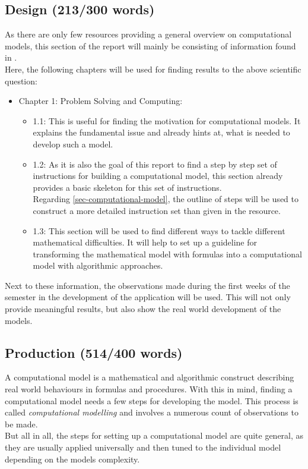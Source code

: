 \documentclass[conference,compsoc]{IEEEtran}
\begin{document}
\subsection{Design (213/300 words)}
As there are only few resources providing a general overview on computational models, this section of the report will mainly be consisting of information found in \cite{ComputationalModelsIntroduction}.\\
Here, the following chapters will be used for finding results to the above scientific question:
\begin{itemize}
	\item Chapter 1: Problem Solving and Computing:
	\begin{itemize}
		\item 1.1: This is useful for finding the motivation for computational models. It explains the fundamental issue and already hints at, what is needed to develop such a model.
		\item 1.2: As it is also the goal of this report to find a step by step set of instructions for building a computational model, this section already provides a basic skeleton for this set of instructions. \\
		Regarding \ref{sec-computational-model}, the outline of steps will be used to construct a more detailed instruction set than given in the resource. 
		\item 1.3: This section will be used to find different ways to tackle different mathematical difficulties. It will help to set up a guideline for transforming the mathematical model with formulas into a computational model with algorithmic approaches. 
	\end{itemize}
	
\end{itemize}
Next to these information, the observations made during the first weeks of the semester in the development of the application will be used. This will not only provide meaningful results, but also show the real world development of the models.
\subsection{Production (514/400 words)}
A computational model is a mathematical and algorithmic construct describing real world behaviours in formulas and procedures. With this in mind, finding a computational model needs a few steps for developing the model. This process is called \emph{computational modelling} and involves a numerous count of observations to be made. \\
But all in all, the steps for setting up a computational model are quite general, as they are usually applied universally and then tuned to the individual model depending on the models complexity.
\end{document}
